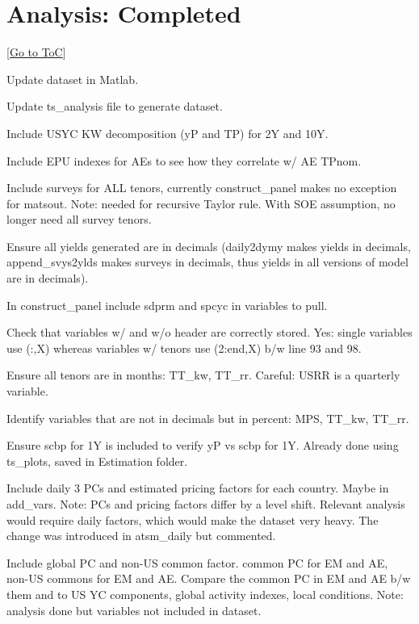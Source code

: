 \documentclass[12pt]{article}
\newcommand{\gototoc}{\vspace{-1.8cm} \null\hfill [\hyperlink{toc}{Go to ToC}] \newline}
\newcommand{\cmark}{\ding{51}}
\newcommand{\xmark}{\ding{55}}
\newcommand{\done}{\rlap{$\square$}{\raisebox{2pt}{\large\hspace{1pt}\cmark}}%
	\hspace{-2.5pt}}
\newcommand{\wontdo}{\rlap{$\square$}{\large\hspace{1pt}\xmark}}
\begin{document}
\section{Analysis: Completed}
\gototoc
	\begin{todolist}
	\item[\done] Update dataset in Matlab.
	\begin{todolist}
		\item[\done] Update ts_analysis file to generate dataset.
		\item[\done] Include USYC KW decomposition (yP and TP) for 2Y and 10Y.
		\item[\done] Include EPU indexes for AEs to see how they correlate w/ AE TPnom.
		\item[\wontdo] Include surveys for ALL tenors, currently construct_panel makes no exception for matsout. Note: needed for recursive Taylor rule. With SOE assumption, no longer need all survey tenors.
		\item[\done] Ensure all yields generated are in decimals (daily2dymy makes yields in decimals, append_svys2ylds makes surveys in decimals, thus yields in all versions of model are in decimals).
		\item[\done] In construct_panel include sdprm and spcyc in variables to pull.
		\item[\done] Check that variables w/ and w/o header are correctly stored. Yes: single variables use (:,X) whereas variables w/ tenors use (2:end,X) b/w line 93 and 98.
		\item[\done] Ensure all tenors are in months: TT_kw, TT_rr. Careful: USRR is a quarterly variable.
		\item[\done] Identify variables that are not in decimals but in percent: MPS, TT_kw, TT_rr.
		\item[\wontdo] Ensure scbp for 1Y is included to verify yP vs scbp for 1Y. Already done using ts_plots, saved in Estimation folder.
		\item[\wontdo] Include daily 3 PCs and estimated pricing factors for each country. Maybe in add_vars. Note: PCs and pricing factors differ by a level shift. Relevant analysis would require daily factors, which would make the dataset very heavy. The change was introduced in atsm_daily but commented.
		\item[\done] Include global PC and non-US common factor. common PC for EM and AE, non-US commons for EM and AE. Compare the common PC in EM and AE b/w them and to US YC components, global activity indexes, local conditions. Note: analysis done but variables not included in dataset.

\end{todolist}
\end{todolist}
\end{document}
